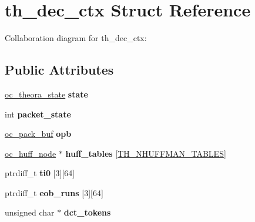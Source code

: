 \hypertarget{structth__dec__ctx}{\section{th\+\_\+dec\+\_\+ctx Struct Reference}
\label{structth__dec__ctx}
}


Collaboration diagram for th\+\_\+dec\+\_\+ctx\+:
\subsection*{Public Attributes}
\begin{DoxyCompactItemize}
\item 
\hypertarget{structth__dec__ctx_ad4761e73908bdb07b2ce3e453f806880}{\hyperlink{structoc__theora__state}{oc\+\_\+theora\+\_\+state} {\bfseries state}}\label{structth__dec__ctx_ad4761e73908bdb07b2ce3e453f806880}

\item 
\hypertarget{structth__dec__ctx_a92e057399ac06c17fa0655bca3d5bb96}{int {\bfseries packet\+\_\+state}}\label{structth__dec__ctx_a92e057399ac06c17fa0655bca3d5bb96}

\item 
\hypertarget{structth__dec__ctx_ad493a18e849664d7849a67d5152b7d27}{\hyperlink{structoc__pack__buf}{oc\+\_\+pack\+\_\+buf} {\bfseries opb}}\label{structth__dec__ctx_ad493a18e849664d7849a67d5152b7d27}

\item 
\hypertarget{structth__dec__ctx_abcc342cf256d45c7f22250aa4acbe88a}{\hyperlink{structoc__huff__node}{oc\+\_\+huff\+\_\+node} $\ast$ {\bfseries huff\+\_\+tables} \mbox{[}\hyperlink{theora_2libtheora-1_81_81_2include_2theora_2codec_8h_a49bf449eae33c5320f0c308f32c6ae42}{T\+H\+\_\+\+N\+H\+U\+F\+F\+M\+A\+N\+\_\+\+T\+A\+B\+L\+E\+S}\mbox{]}}\label{structth__dec__ctx_abcc342cf256d45c7f22250aa4acbe88a}

\item 
\hypertarget{structth__dec__ctx_a1b77f2a292d949185be45d7a8a0232c6}{ptrdiff\+\_\+t {\bfseries ti0} \mbox{[}3\mbox{]}\mbox{[}64\mbox{]}}\label{structth__dec__ctx_a1b77f2a292d949185be45d7a8a0232c6}

\item 
\hypertarget{structth__dec__ctx_a919fce8a08aa5a0fbec021d2453ea850}{ptrdiff\+\_\+t {\bfseries eob\+\_\+runs} \mbox{[}3\mbox{]}\mbox{[}64\mbox{]}}\label{structth__dec__ctx_a919fce8a08aa5a0fbec021d2453ea850}

\item 
\hypertarget{structth__dec__ctx_a079592c057911408684174b0342e6a94}{unsigned char $\ast$ {\bfseries dct\+\_\+tokens}}\label{structth__dec__ctx_a079592c057911408684174b0342e6a94}


\end{DoxyCompactItemize}
